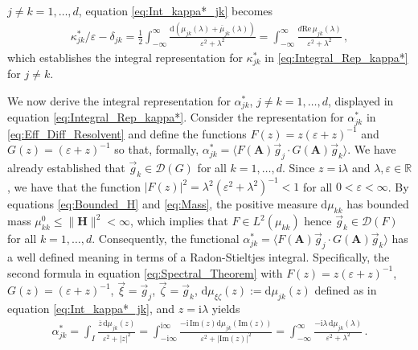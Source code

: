 \documentclass[11pt]{amsart}
\newcommand{\I}{\mathrm{i}}
\renewcommand{\d}{\mathrm{d}}
\newcommand{\Hb}{\mathbf{H}}
\newcommand{\Ab}{\mathbf{A}}
\newcommand{\Qb}{\mathbf{Q}}
\newcommand{\Ds}{\mathscr{D}}
\begin{document}
$j\neq k=1,\ldots,d$, equation \eqref{eq:Int_kappa*_jk} becomes
% 
\begin{align}\label{eq:Int_kappa*_jk_Re}
  \kappa^*_{jk}/\varepsilon-\delta_{jk}
       =\frac{1}{2}\int_{-\infty}^\infty\frac{\d(\mu_{jk}(\lambda)+\overline{\mu}_{jk}(\lambda))}{\varepsilon^2+\lambda^2}
       =\int_{-\infty}^\infty\frac{d\text{Re}\,\mu_{jk}(\lambda)}{\varepsilon^2+\lambda^2}\,,            
\end{align}
%
which establishes the integral representation for $\kappa^*_{jk}$ in
\eqref{eq:Integral_Rep_kappa*} for $j\neq k$. 





We now derive the integral representation for $\alpha^*_{jk}$, $j\neq k=1,\ldots,d$,
displayed in equation \eqref{eq:Integral_Rep_kappa*}. Consider the
representation for $\alpha^*_{jk}$ in \eqref{eq:Eff_Diff_Resolvent} and
define the functions $F(z)=z(\varepsilon+z)^{-1}$ and $G(z)=(\varepsilon+z)^{-1}$ so that,
formally, $\alpha^*_{jk}=\langle F(\Ab)\vec{g}_j\cdot G(\Ab)\vec{g}_k\rangle$. We have
already established that $\vec{g}_k\in\Ds(G)$ for all
$k=1,\ldots,d$. Since $z=\I\lambda$ and $\lambda,\varepsilon\in\mathbb{R}$, we have that the
function $|F(z)|^2=\lambda^2(\varepsilon^2+\lambda^2)^{-1}<1$ for all $0<\varepsilon<\infty$.  By equations
\eqref{eq:Bounded_H} and \eqref{eq:Mass}, the positive measure
$\d\mu_{kk}$ has bounded mass $\mu^0_{kk}\leq\|\Hb\|^2<\infty$, which implies that
$F\in L^2(\mu_{kk})$ hence $\vec{g}_k\in\Ds(F)$ for all
$k=1,\ldots,d$. Consequently, the functional $\alpha^*_{jk}=\langle F(\Ab)\vec{g}_j\cdot
G(\Ab)\vec{g}_k\rangle$ has a well defined 
meaning in terms of a Radon-Stieltjes integral. Specifically, the
second formula in equation \eqref{eq:Spectral_Theorem} with
$F(z)=z(\varepsilon+z)^{-1}$, $G(z)=(\varepsilon+z)^{-1}$, $\vec{\xi}=\vec{g}_j$,
$\vec{\zeta}=\vec{g}_k$, $\d\mu_{\xi\zeta}(z):=\d\mu_{jk}(z)$ defined as in equation
\eqref{eq:Int_kappa*_jk}, 
and $z=\I\lambda$ yields          
%
\begin{align}\label{eq:Int_alpha*_jk}
  \alpha^*_{jk}
     =\int_I\frac{\overline{z}\,\d\mu_{jk}(z)}{\varepsilon^2+|z|^2}
     =\int_{-\I\infty}^{\I\infty}\frac{-\I\,\text{Im}(z)\d\mu_{jk}(\text{Im}(z))}{\varepsilon^2+|\text{Im}(z)|^2}
     =\int_{-\infty}^\infty\frac{-\I\lambda\,\d\mu_{jk}(\lambda)}{\varepsilon^2+\lambda^2}\,.
\end{align}
%
\end{document}
